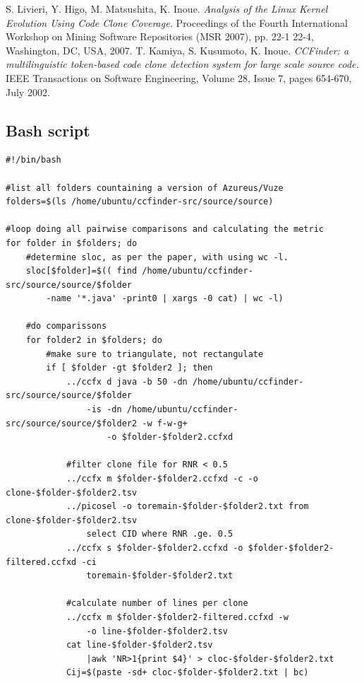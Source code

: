 \documentclass[a4paper,twoside, twocolumn, 11pt]{article}
\numberwithin{equation}{section}
\begin{document}
\begin{thebibliography}{9}
S. Livieri, Y. Higo, M. Matsushita, K. Inoue. \emph{Analysis of the Linux Kernel Evolution Using Code Clone Coverage.} Proceedings of the Fourth International Workshop on Mining Software Repositories (MSR 2007),  pp. 22-1 22-4, Washington, DC, USA, 2007.
T. Kamiya, S. Kusumoto, K. Inoue. \emph{CCFinder: a multilinguistic token-based code clone detection system for large scale source code.} IEEE Transactions on Software Engineering, Volume 28, Issue 7, pages 654-670, July 2002.
\end{thebibliography}


\onecolumn
\pagestyle{empty} %
\begin{appendices}
\section{Bash script}\label{script}
\scriptsize
\begin{verbatim}
#!/bin/bash

#list all folders countaining a version of Azureus/Vuze
folders=$(ls /home/ubuntu/ccfinder-src/source/source)

#loop doing all pairwise comparisons and calculating the metric
for folder in $folders; do
    #determine sloc, as per the paper, with using wc -l.
    sloc[$folder]=$(( find /home/ubuntu/ccfinder-src/source/source/$folder 
        -name '*.java' -print0 | xargs -0 cat) | wc -l)

    #do comparissons
    for folder2 in $folders; do    
        #make sure to triangulate, not rectangulate
        if [ $folder -gt $folder2 ]; then     
            ../ccfx d java -b 50 -dn /home/ubuntu/ccfinder-src/source/source/$folder 
                -is -dn /home/ubuntu/ccfinder-src/source/source/$folder2 -w f-w-g+ 
                    -o $folder-$folder2.ccfxd 

            #filter clone file for RNR < 0.5
            ../ccfx m $folder-$folder2.ccfxd -c -o clone-$folder-$folder2.tsv            
            ../picosel -o toremain-$folder-$folder2.txt from clone-$folder-$folder2.tsv 
                select CID where RNR .ge. 0.5
            ../ccfx s $folder-$folder2.ccfxd -o $folder-$folder2-filtered.ccfxd -ci 
                toremain-$folder-$folder2.txt

            #calculate number of lines per clone
            ../ccfx m $folder-$folder2-filtered.ccfxd -w 
                -o line-$folder-$folder2.tsv 
            cat line-$folder-$folder2.tsv
                |awk 'NR>1{print $4}' > cloc-$folder-$folder2.txt
            Cij=$(paste -sd+ cloc-$folder-$folder2.txt | bc)


\end{verbatim}
\end{appendices}
\end{document}
